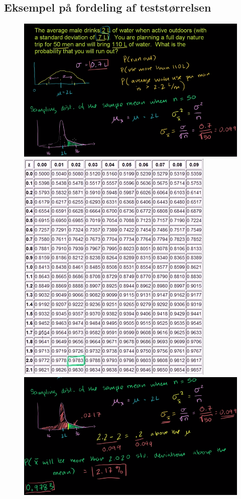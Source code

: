 \documentclass[11pt]{article}
\begin{document}
\subsection{Eksempel på fordeling af teststørrelsen}
\begin{figure}[H]
\centering
\includegraphics[scale=0.5]{img/Selection_013}
\includegraphics[scale=0.3]{img/Selection_012}
\includegraphics[scale=0.5]{img/Selection_011}
\end{figure}
\end{document}
